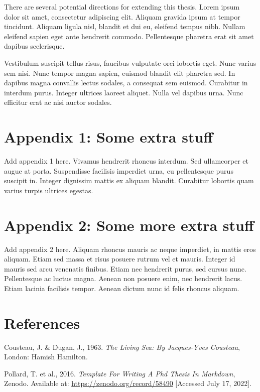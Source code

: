 \documentclass[12pt,a4paper,]{report}
\newlength{\cslhangindent}
\newenvironment{CSLReferences}[2] %
 {%
  \setlength{\parindent}{0pt}
  \ifodd #1 \everypar{\setlength{\hangindent}{\cslhangindent}}\ignorespaces\fi
  \ifnum #2 > 0
  \setlength{\parskip}{#2\baselineskip}
  \fi
 }%
 {}
\begin{document}
There are several potential directions for extending this thesis. Lorem
ipsum dolor sit amet, consectetur adipiscing elit. Aliquam gravida ipsum
at tempor tincidunt. Aliquam ligula nisl, blandit et dui eu, eleifend
tempus nibh. Nullam eleifend sapien eget ante hendrerit commodo.
Pellentesque pharetra erat sit amet dapibus scelerisque.

Vestibulum suscipit tellus risus, faucibus vulputate orci lobortis eget.
Nunc varius sem nisi. Nunc tempor magna sapien, euismod blandit elit
pharetra sed. In dapibus magna convallis lectus sodales, a consequat sem
euismod. Curabitur in interdum purus. Integer ultrices laoreet aliquet.
Nulla vel dapibus urna. Nunc efficitur erat ac nisi auctor sodales.

\hypertarget{appendix-1-some-extra-stuff}{%
\chapter*{Appendix 1: Some extra
stuff}\label{appendix-1-some-extra-stuff}}

Add appendix 1 here. Vivamus hendrerit rhoncus interdum. Sed ullamcorper
et augue at porta. Suspendisse facilisis imperdiet urna, eu pellentesque
purus suscipit in. Integer dignissim mattis ex aliquam blandit.
Curabitur lobortis quam varius turpis ultrices egestas.

\hypertarget{appendix-2-some-more-extra-stuff}{%
\chapter*{Appendix 2: Some more extra
stuff}\label{appendix-2-some-more-extra-stuff}}

Add appendix 2 here. Aliquam rhoncus mauris ac neque imperdiet, in
mattis eros aliquam. Etiam sed massa et risus posuere rutrum vel et
mauris. Integer id mauris sed arcu venenatis finibus. Etiam nec
hendrerit purus, sed cursus nunc. Pellentesque ac luctus magna. Aenean
non posuere enim, nec hendrerit lacus. Etiam lacinia facilisis tempor.
Aenean dictum nunc id felis rhoncus aliquam.

\footnotesize
\singlespacing
\setlength{\parindent}{0in}

\hypertarget{references}{%
\chapter*{References}\label{references}}

\hypertarget{refs}{}
\begin{CSLReferences}{1}{0}
\leavevmode{}%
Cousteau, J. \& Dugan, J., 1963. \emph{The {Living Sea}: By
{Jacques-Yves Cousteau}}, {London}: {Hamish Hamilton}.

\leavevmode{}%
Pollard, T. et al., 2016. \emph{Template {For Writing A Phd Thesis In
Markdown}}, {Zenodo}. Available at:
\url{https://zenodo.org/record/58490} {[}Accessed July 17, 2022{]}.

\end{CSLReferences}
\end{document}
